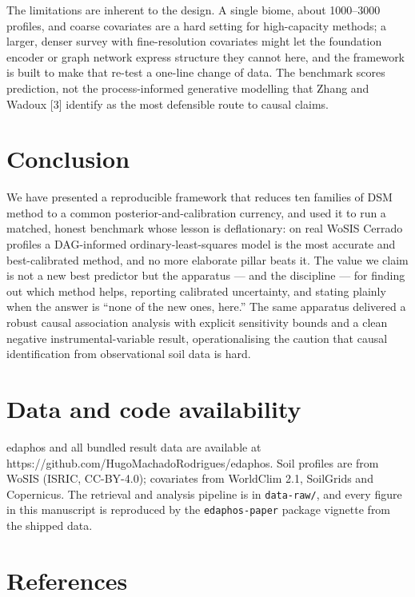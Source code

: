 \documentclass[10pt,letterpaper]{article}
\begin{document}
The limitations are inherent to the design. A single biome, about
1000--3000 profiles, and coarse covariates are a hard setting for
high-capacity methods; a larger, denser survey with fine-resolution
covariates might let the foundation encoder or graph network express
structure they cannot here, and the framework is built to make that
re-test a one-line change of data. The benchmark scores prediction, not
the process-informed generative modelling that Zhang and Wadoux {[}3{]}
identify as the most defensible route to causal claims.

\section{Conclusion}\label{conclusion}

We have presented a reproducible framework that reduces ten families of
DSM method to a common posterior-and-calibration currency, and used it
to run a matched, honest benchmark whose lesson is deflationary: on real
WoSIS Cerrado profiles a DAG-informed ordinary-least-squares model is
the most accurate and best-calibrated method, and no more elaborate
pillar beats it. The value we claim is not a new best predictor but the
apparatus --- and the discipline --- for finding out which method helps,
reporting calibrated uncertainty, and stating plainly when the answer is
``none of the new ones, here.'' The same apparatus delivered a robust
causal association analysis with explicit sensitivity bounds and a clean
negative instrumental-variable result, operationalising the caution that
causal identification from observational soil data is hard.

\section*{Data and code availability}\label{dataavail}

edaphos and all bundled result data are available at
https://github.com/HugoMachadoRodrigues/edaphos. Soil profiles are from
WoSIS (ISRIC, CC-BY-4.0); covariates from WorldClim 2.1, SoilGrids and
Copernicus. The retrieval and analysis pipeline is in
\texttt{data-raw/}, and every figure in this manuscript is reproduced by
the \texttt{edaphos-paper} package vignette from the shipped data.

\section*{References}\label{references}
\end{document}
